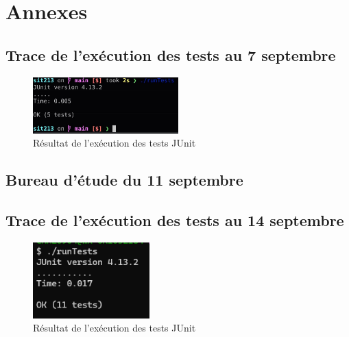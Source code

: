 \section*{Annexes}
\setcounter{section}{3}
\setcounter{subsection}{0}

\subsection{Trace de l'exécution des tests au 7 septembre}
\begin{figure}[H]
    \centering
    \includegraphics[width=0.5\textwidth]{img/etape1_tests_7sep.jpg}
    \caption{Résultat de l'exécution des tests JUnit}
    \label{fig:tests1}
\end{figure}

\subsection{Bureau d'étude du 11 septembre}


\subsection{Trace de l'exécution des tests au 14 septembre}
\begin{figure}[H]
    \centering
    \includegraphics[width=0.4\textwidth]{img/etape2_tests_14sep.png}
    \caption{Résultat de l'exécution des tests JUnit}
    \label{fig:tests2}
\end{figure}